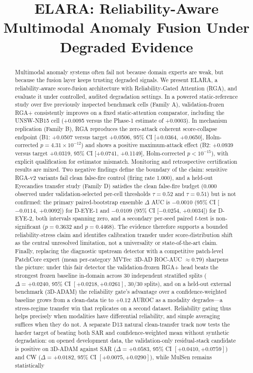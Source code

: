 \documentclass[10pt,conference]{IEEEtran}
\title{ELARA: Reliability-Aware Multimodal Anomaly Fusion Under Degraded Evidence}
\author{
  \IEEEauthorblockN{Pratik Niroula}
  \IEEEauthorblockA{
    Independent Researcher
  }
}
\begin{document}
\maketitle

\begin{abstract}
Multimodal anomaly systems often fail not because domain experts are weak, but because the fusion layer keeps trusting degraded signals. We present ELARA, a reliability-aware score-fusion architecture with Reliability-Gated Attention (RGA), and evaluate it under controlled, audited degradation settings. In a powered static-reference study over five previously inspected benchmark cells (Family A), validation-frozen RGA+ consistently improves on a fixed static-attention comparator, including the UNSW-NB15 cell (+0.0095 versus the Phase-1 estimate of +0.0003). In mechanism replication (Family B), RGA reproduces the zero-attack coherent score-collapse endpoint (B1: +0.0507 versus target +0.0506, 95\% CI [+0.0364, +0.0650], Holm-corrected $p = 4.31\times 10^{-12}$) and shows a positive maximum-attack effect (B2: +0.0939 versus target +0.0319, 95\% CI [+0.0741, +0.1149], Holm-corrected $p < 10^{-15}$), with explicit qualification for estimator mismatch. Monitoring and retrospective certification results are mixed. Two negative findings define the boundary of the claim: sensitive RGA-v2 variants fail clean false-fire control (firing rate 1.000), and a held-out Eyecandies transfer study (Family D) satisfies the clean false-fire budget ($0.000$ observed under validation-selected per-cell thresholds $\tau = 0.52$ and $\tau = 0.51$) but is not confirmed: the primary paired-bootstrap ensemble $\Delta$ AUC is $-0.0010$ (95\% CI [$-0.0114$, $+0.0092$]) for D-EYE-1 and $-0.0109$ (95\% CI [$-0.0254$, $+0.0034$]) for D-EYE-2, both intervals spanning zero, and a secondary per-seed paired $t$-test is non-significant ($p = 0.3632$ and $p = 0.4468$). The evidence therefore supports a bounded reliability-stress claim and identifies calibration transfer under score-distribution shift as the central unresolved limitation, not a universality or state-of-the-art claim. Finally, replacing the diagnostic upstream detector with a competitive patch-level PatchCore expert (mean per-category MVTec~3D-AD ROC-AUC $\approx 0.79$) sharpens the picture: under this fair detector the validation-frozen RGA+ head beats the strongest frozen baseline in-domain across $30$ independent stratified splits ($\Delta = +0.0240$, 95\% CI $[+0.0218,+0.0261]$, $30/30$ splits), and on a held-out external benchmark (3D-ADAM) the reliability gate's advantage over a confidence-weighted baseline grows from a clean-data tie to $+0.12$ AUROC as a modality degrades---a stress-regime transfer win that replicates on a second dataset. Reliability gating thus helps precisely when modalities have differential reliability, and simple averaging suffices when they do not. A separate D13 natural clean-transfer track now tests the harder target of beating both SAR and confidence-weighted mean without synthetic degradation: on opened development data, the validation-only residual-stack candidate is positive on 3D-ADAM against SAR ($\Delta=+0.0583$, 95\% CI $[+0.0410,+0.0759]$) and CW ($\Delta=+0.0182$, 95\% CI $[+0.0075,+0.0290]$), while MulSen remains statistically 
\end{abstract}
\end{document}
